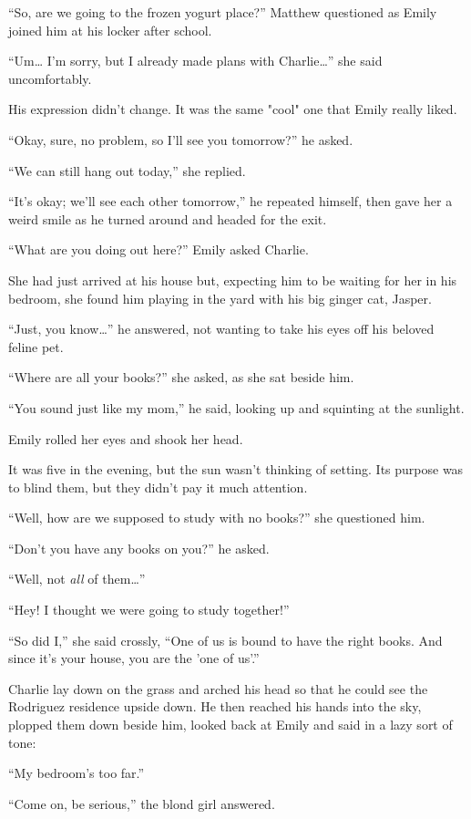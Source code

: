 “So, are we going to the frozen yogurt place?” Matthew questioned as Emily joined him at his locker after school.

“Um… I'm sorry, but I already made plans with Charlie…” she said uncomfortably.

His expression didn't change. It was the same "cool" one that Emily really liked.

“Okay, sure, no problem, so I'll see you tomorrow?” he asked.

“We can still hang out today,” she replied.

“It's okay; we'll see each other tomorrow,” he repeated himself, then gave her a weird smile as he turned around and headed for the exit.

\bigskip

“What are you doing out here?” Emily asked Charlie.

She had just arrived at his house but, expecting him to be waiting for her in his bedroom, she found him playing in the yard with his big ginger cat, Jasper.

“Just, you know…” he answered, not wanting to take his eyes off his beloved feline pet.

“Where are all your books?” she asked, as she sat beside him.

“You sound just like my mom,” he said, looking up and squinting at the sunlight.

Emily rolled her eyes and shook her head.

It was five in the evening, but the sun wasn't thinking of setting. Its purpose was to blind them, but they didn't pay it much attention.

“Well, how are we supposed to study with no books?” she questioned him.

“Don't you have any books on you?” he asked.

“Well, not \textit{all} of them…”

“Hey! I thought we were going to study together!”

“So did I,” she said crossly, “One of us is bound to have the right books. And since it's your house, you are the 'one of us'.”

Charlie lay down on the grass and arched his head so that he could see the Rodriguez residence upside down. He then reached his hands into the sky, plopped them down beside him, looked back at Emily and said in a lazy sort of tone:

“My bedroom's too far.”

“Come on, be serious,” the blond girl answered.

